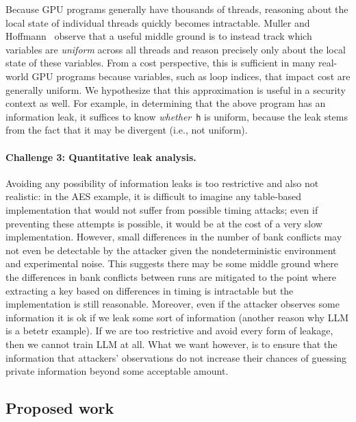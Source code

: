 Because GPU programs generally have thousands of threads, reasoning about the local state of individual threads quickly becomes intractable.
%
Muller and Hoffmann~\cite{MullerHo21} observe that a useful middle ground is to instead track which variables are {\em uniform} across all threads and reason precisely only about the local state of these variables.
%
From a cost perspective, this is sufficient in many real-world GPU programs because variables, such as loop indices, that impact cost are generally uniform.
%
We hypothesize that this approximation is useful in a security context as well.
%
For example, in determining that the above program has an information leak, it suffices to know {\em whether}~\lstinline{h} is uniform, because the leak stems from the fact that it may be divergent (i.e., not uniform).


\paragraph{Challenge 3: Quantitative leak analysis.}
Avoiding any possibility of information leaks is too restrictive and also not realistic: in the AES example, it is difficult to imagine any table-based implementation that would not suffer from possible timing attacks; even if preventing these attempts is possible, it would be at the cost of a very slow implementation.
%
However, small differences in the number of bank conflicts may not even be detectable by the attacker given the nondeterministic environment and experimental noise.
%
This suggests there may be some middle ground where the differences in bank conflicts between runs are mitigated to the point where extracting a key based on differences in timing is intractable but the implementation is still reasonable.
%
Moreover, even if the attacker observes some information it is ok if we leak some sort of information (another reason why LLM is a betetr example).
%
If we are too restrictive and avoid every form of leakage, then we cannot train LLM at all. 
%
What we want however, is to ensure that the information that attackers' observations do not increase their chances of guessing private information beyond some acceptable amount.



%









\subsection{Proposed work}



